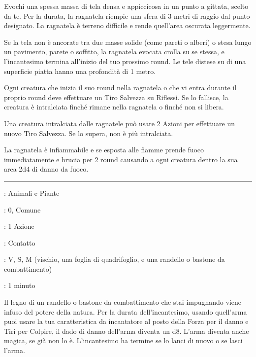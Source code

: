 \begin{multicols}{2}
Evochi una spessa massa di tela densa e appiccicosa in un punto a gittata, scelto da te. Per la durata, la ragnatela riempie una sfera di 3 metri di raggio dal punto designato. La ragnatela è terreno difficile e rende quell'area oscurata leggermente.

Se la tela non è ancorate tra due masse solide (come pareti o alberi) o stesa lungo un pavimento, parete o soffitto, la ragnatela evocata crolla su se stessa, e l'incantesimo termina all'inizio del tuo prossimo round. Le tele distese su di una superficie piatta hanno una profondità di 1 metro.

Ogni creatura che inizia il suo round nella ragnatela o che vi entra durante il proprio round deve effettuare un Tiro Salvezza su Riflessi. Se lo fallisce, la creatura è intralciata finché rimane nella ragnatela o finché non si libera.

Una creatura intralciata dalle ragnatele può usare 2 Azioni per effettuare un nuovo Tiro Salvezza. Se lo supera, non è più intralciata.

La ragnatela è infiammabile e se esposta alle fiamme prende fuoco immediatamente e brucia per 2 round causando a ogni creatura dentro la sua area 2d4 di danno da fuoco.

\smallskip\noindent\rule{\linewidth}{2pt} \hypertarget{Randello Incantato}{}\smallskip{}
\noindent
\begin{description}[noitemsep, topsep=0pt, parsep=0pt, partopsep=0pt, leftmargin=0cm, labelwidth=2.8cm]
	\item[\textbf{Lista di Magia}]: Animali e Piante
	\item[\textbf{Livello}]: 0, Comune
	\item[\textbf{T. di Lancio}]: 1 Azione
	\item[\textbf{Gittata}]: Contatto
	\item[\textbf{Componenti}]: V, S, M (vischio, una foglia di quadrifoglio, e una randello o bastone da combattimento)
	\item[\textbf{Durata}]: 1 minuto
\end{description}

Il legno di un randello o bastone da combattimento che stai impugnando viene infuso del potere della natura. Per la durata dell'incantesimo, usando quell'arma puoi usare la tua caratteristica da incantatore al posto della Forza per il danno e Tiri per Colpire, il dado di danno dell'arma diventa un d8. L'arma diventa anche magica, se già non lo è. L'incantesimo ha termine se lo lanci di nuovo o se lasci l'arma.


\end{multicols}
